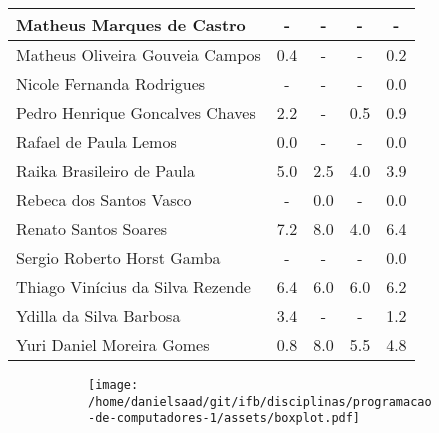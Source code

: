 \documentclass{article}
\begin{document}
\begin{longtable}{|l|c|c|c|c|}
Matheus Marques de Castro & - & - & - & -\\\hline
Matheus Oliveira Gouveia Campos & 0.4 & - & - & 0.2\\\hline
Nicole Fernanda Rodrigues & - & - & - & 0.0\\\hline
Pedro Henrique Goncalves Chaves & 2.2 & - & 0.5 & 0.9\\\hline
Rafael de Paula Lemos & 0.0 & - & - & 0.0\\\hline
Raika Brasileiro de Paula & 5.0 & 2.5 & 4.0 & 3.9\\\hline
Rebeca dos Santos Vasco & - & 0.0 & - & 0.0\\\hline
Renato Santos Soares & 7.2 & 8.0 & 4.0 & 6.4\\\hline
Sergio Roberto Horst Gamba & - & - & - & 0.0\\\hline
Thiago Vinícius da Silva Rezende & 6.4 & 6.0 & 6.0 & 6.2\\\hline
Ydilla da Silva Barbosa & 3.4 & - & - & 1.2\\\hline
Yuri Daniel Moreira Gomes & 0.8 & 8.0 & 5.5 & 4.8\\\hline
\end{longtable}
\begin{figure}[h!]
\centering\begin{subfigure}
        \centering
        \texttt{[image: /home/danielsaad/git/ifb/disciplinas/programacao-de-computadores-1/assets/boxplot.pdf]}
    \end{subfigure}\end{figure}
\end{document}
